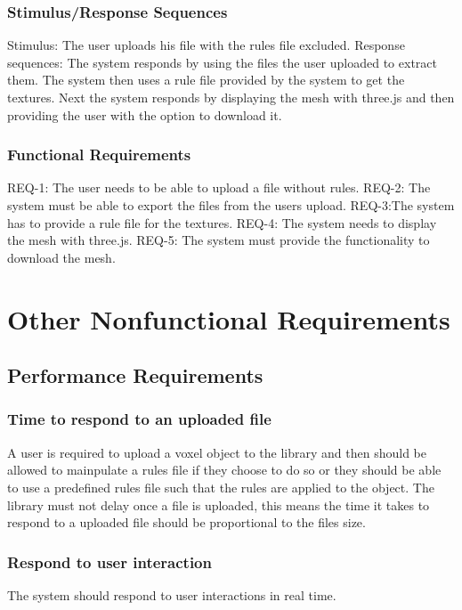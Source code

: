 \documentclass[english]{article}
\begin{document}
			 \subsubsection{Stimulus/Response Sequences}
			 	Stimulus: The user uploads his file with the rules file excluded.
			 	Response sequences: The system responds by using the files the user uploaded to extract them. The system then uses a rule file provided by the system to get the textures. Next the system responds by displaying the mesh with three.js and then providing the user with the option to download it. 
			 \subsubsection{Functional Requirements}
			 	REQ-1: The user needs to be able to upload a file  without rules.
			 	REQ-2: The system must be able to export the files from the users upload.
			 	REQ-3:The system has to provide a rule file for the textures.
			 	REQ-4: The system needs to display the mesh with three.js.
			 	REQ-5: The system must provide the functionality to download the mesh.
	\pagebreak
	
	\section{Other Nonfunctional Requirements}
	
		\subsection{Performance Requirements}
		\subsubsection {Time to respond to an uploaded file}
		A user is required to upload a voxel object to the library and then should be allowed to mainpulate a rules file if they choose to do so or they should be able to use a predefined rules file such that the rules are applied to the object. The library must not delay once a file is uploaded, this means the time it takes to respond to a uploaded file should be proportional to the files size.
		
		\subsubsection{Respond to user interaction}
		The system should respond to user interactions in real time.
		
\end{document}
